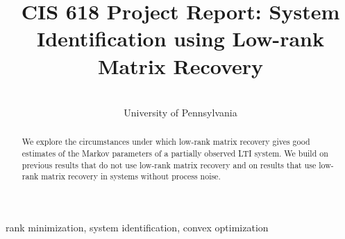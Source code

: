 \documentclass[12pt]{l4dc2021}
\title[System Identification using Low-rank Matrix Recovery]
{CIS 618 Project Report: System Identification using Low-rank Matrix Recovery}
\author{%
 \Name{Steve Hsu} \Email{stevehsu@seas.upenn.edu}\\
 \addr University of Pennsylvania
}
\begin{document}
\maketitle

\begin{abstract}%
  We explore the circumstances under which
  low-rank matrix recovery gives good estimates
  of the Markov parameters of a partially observed LTI system.
  We build on previous results that do not use low-rank matrix recovery
  and on results that use low-rank matrix recovery
  in systems without process noise.
\end{abstract}

\begin{keywords}%
  rank minimization, system identification, convex optimization
\end{keywords}









\end{document}
